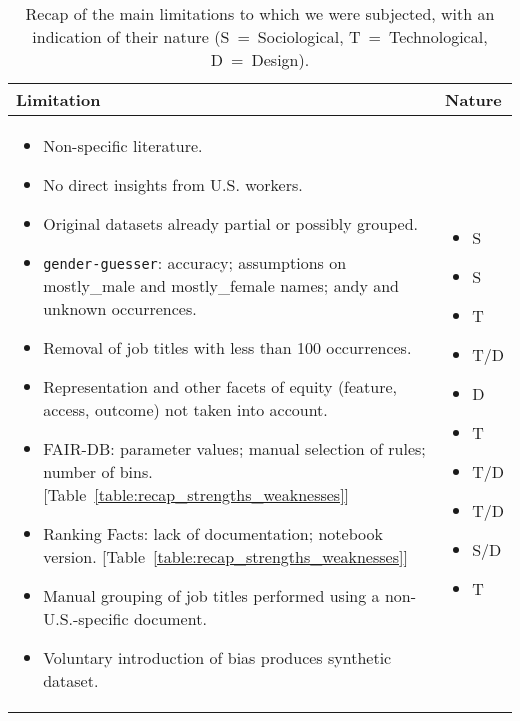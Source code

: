 \begin{table}[t!]
\begin{tabularx}{\columnwidth}{|Y|>{\centering\arraybackslash}p{1.5cm}|}
\hline
Limitation & Nature\\
\hline
\begin{itemize}[topsep=0pt,leftmargin=*]
\item \nohyphens{Non-specific literature.}
\item \nohyphens{No direct insights from U.S. workers.}
\item \nohyphens{Original datasets already partial or possibly grouped.}
\item \nohyphens{\texttt{gender-guesser}: accuracy; assumptions on mostly\_male and mostly\_female names; andy and unknown occurrences.}
\item \nohyphens{Removal of job titles with less than 100 occurrences.}
\item \nohyphens{Representation and other facets of equity (feature, access, outcome) not taken into account.}
\item \nohyphens{FAIR-DB: parameter values; manual selection of rules; number of bins. [Table~\ref{table:recap_strengths_weaknesses}]}
\item \nohyphens{Ranking Facts: lack of documentation; notebook version. [Table~\ref{table:recap_strengths_weaknesses}]}
\item \nohyphens{Manual grouping of job titles performed using a non-U.S.-specific document.}
\item \nohyphens{Voluntary introduction of bias produces synthetic dataset.}
\end{itemize} & \begin{itemize}[label={},topsep=0pt,leftmargin=*]
\centering
\item \nohyphens{S}
\item \nohyphens{S}
\item \nohyphens{T}
\item \nohyphens{T/D}\vspace{\baselineskip}
\item \nohyphens{D}
\item \nohyphens{T}\vspace{\baselineskip}
\item \nohyphens{T/D}\vspace{\baselineskip}
\item \nohyphens{T/D}\vspace{\baselineskip}
\item \nohyphens{S/D}\vspace{\baselineskip}
\item \nohyphens{T}
\end{itemize}\\
\hline
\end{tabularx}
\centering
\caption{Recap of the main limitations to which we were subjected, with an indication of their nature (S~=~Sociological, T~=~Technological, D~=~Design).}
\label{table:recap_limitations}
\end{table}

